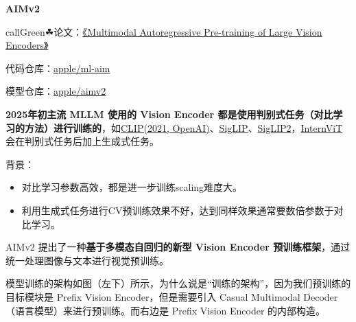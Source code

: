 \documentclass[zihao=false,fontset=windows]{ctexart}
\begin{document}
{\bfseries AIMv2\par}

\begin{feishubox}{callGreen}{☘}论文：\href{https://arxiv.org/pdf/2411.14402}{《Multimodal Autoregressive Pre-training of Large Vision Encoders》}\par 代码仓库：\href{https://github.com/apple/ml-aim}{apple/ml-aim}\par 模型仓库：\href{https://huggingface.co/collections/apple/aimv2}{apple/aimv2}\end{feishubox}

\textcolor{feishuRed}{\textbf{2025年初主流 MLLM 使用的 Vision Encoder 都是使用判别式任务（对比学习的方法）进行训练的}}，如\href{https://scnajei2ds6y.feishu.cn/wiki/FKvTwjSHxiVHBokxd5ncXxuanch}{CLIP(2021, OpenAI)}、\href{https://scnajei2ds6y.feishu.cn/wiki/IAqAwbiLVi0gEOkC87Qc0hAVnPe}{SigLIP}、\href{https://scnajei2ds6y.feishu.cn/wiki/H3biwpNrQiAgk2kd9bscXeS2nkb}{SigLIP2}，\href{https://scnajei2ds6y.feishu.cn/wiki/SXzcw2VtHig3bPkRfIickYa8nVh}{InternViT}会在判别式任务后加上生成式任务。\par

背景：\par

\begin{itemize}
\item 对比学习参数高效，都是进一步训练scaling难度大。
\item 利用生成式任务进行CV预训练效果不好，达到同样效果通常要数倍参数于对比学习。
\end{itemize}

AIMv2 提出了一种\textcolor{feishuRed}{\textbf{基于多模态自回归的新型 Vision Encoder 预训练框架}}，通过统一处理图像与文本进行视觉预训练。\par

\par{}\vspace{1em}\par\vspace{0.28em}

模型训练的架构如图（左下）所示，为什么说是“训练的架构”，因为\textcolor{feishuRed}{我们预训练的目标模块是 Prefix Vision Encoder}，但是需要引入 Casual Multimodal Decoder（语言模型）来进行预训练。而右边是 Prefix Vision Encoder 的内部构造。\par
\end{document}
